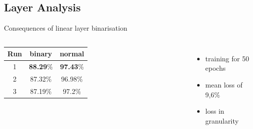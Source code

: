 \documentclass[aspectratio=1610, 12pt]{beamer}
\begin{document}
\subsection{Layer Analysis}
\begin{frame}{Consequences of linear layer binarisation}


	\begin{columns}
		\centering
		\begin{tabular}{|c|c|c|}\hline
			Run & binary           & normal           \\\hline
			1   & \textbf{88.29}\% & \textbf{97.43}\% \\\hline
			2   & 87.32\%          & 96.98\%          \\\hline
			3   & 87.19\%          & 97.2\%           \\\hline
		\end{tabular}
		\begin{itemize}
			\item training for 50 epochs
			\item mean loss of 9,6\%
			\item loss in granularity
		\end{itemize}

	\end{columns}


\end{frame}
\end{document}

